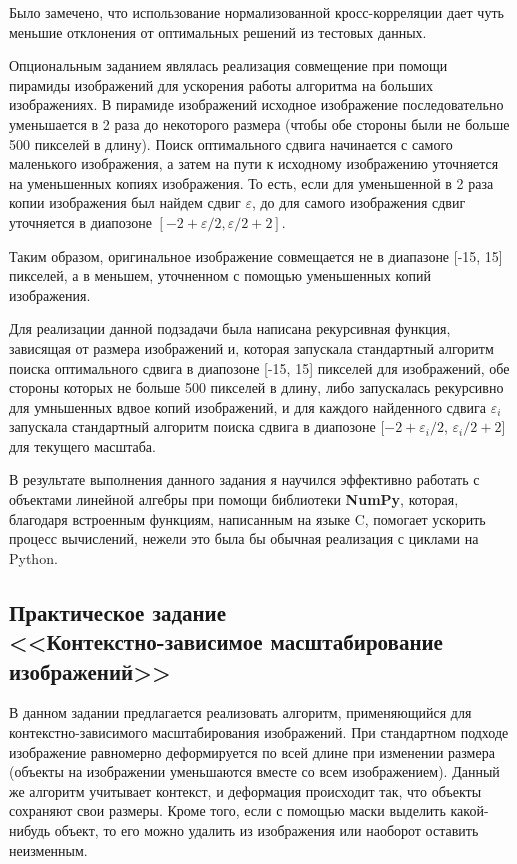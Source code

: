 \documentclass[a4paper, 12pt]{article}
\begin{document}
Было замечено, что использование нормализованной кросс-корреляции дает чуть меньшие отклонения от оптимальных решений из тестовых данных.

Опциональным заданием являлась реализация совмещение при помощи пирамиды изображений для ускорения работы алгоритма на больших изображениях. В пирамиде изображений исходное изображение последовательно уменьшается в 2 раза до некоторого размера (чтобы
обе стороны были не больше 500 пикселей в длину). Поиск оптимального сдвига начинается с самого
маленького изображения, а затем на пути к исходному изображению уточняется на уменьшенных
копиях изображения. То есть, если для уменьшенной в 2 раза копии изображения был найдем сдвиг $\varepsilon$, до для самого изображения сдвиг уточняется в диапозоне $[-2+\varepsilon/2, \varepsilon/2+2]$.

Таким образом, оригинальное изображение совмещается не в диапазоне
[-15, 15] пикселей, а в меньшем, уточненном с помощью уменьшенных копий изображения.

Для реализации данной подзадачи была написана рекурсивная функция, зависящая от размера изображений и, которая запускала стандартный алгоритм поиска оптимального сдвига в диапозоне [-15, 15] пикселей для изображений, обе стороны которых не больше 500 пикселей в длину, либо запускалась рекурсивно для умньшенных вдвое копий изображений, и для каждого найденного сдвига $\varepsilon_i$ запускала стандартный алгоритм поиска сдвига в диапозоне [$-2+\varepsilon_i/2$, $\varepsilon_i/2+2$] для текущего масштаба.

В результате выполнения данного задания я научился эффективно работать с объектами линейной алгебры при помощи библиотеки \textbf{NumPy}, которая, благодаря встроенным функциям, написанным на языке C, помогает ускорить процесс вычислений, нежели это была бы обычная реализация с циклами на Python.

\newpage

\subsection*{Практическое задание\\ <<Контекстно-зависимое масштабирование изображений>>}
%

В данном задании предлагается реализовать алгоритм, применяющийся для контекстно-зависимого
масштабирования изображений. При стандартном подходе изображение равномерно деформируется
по всей длине при изменении размера (объекты на изображении уменьшаются вместе со всем
изображением). Данный же алгоритм учитывает контекст, и деформация происходит так, что
объекты сохраняют свои размеры. Кроме того, если с помощью маски выделить какой-нибудь объект,
то его можно удалить из изображения или наоборот оставить неизменным.
\end{document}
